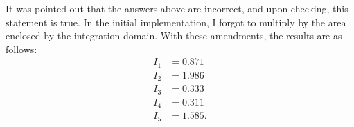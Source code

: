 {{\color{red} 

It was pointed out that the answers above are incorrect, and upon checking, this statement is true.
In the initial implementation, I forgot to multiply by the area enclosed by the integration domain.
With these amendments, the results are as follows:
\begin{align}
    I_1 &= 0.871 \\
    I_2 &= 1.986 \\
    I_3 &= 0.333 \\
    I_4 &= 0.311 \\
    I_5 &= 1.585
.\end{align}

}



}

    



